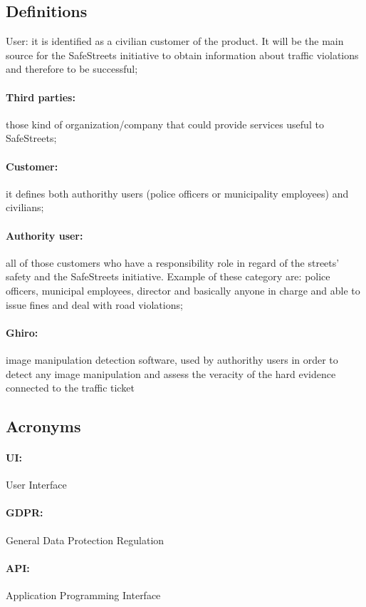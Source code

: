         \subsection{Definitions}
        {User:} it is identified as a civilian customer of the product. It will
        be the main source for the SafeStreets initiative to obtain information
        about traffic violations and therefore to be successful;
        \paragraph{Third parties:}those kind of organization/company that could
        provide services useful to SafeStreets; \paragraph{Customer:} it defines
        both authorithy users (police officers or municipality employees) and
        civilians; \paragraph{Authority user:}all of those customers who have a
        responsibility role in regard of the streets' safety and the SafeStreets
        initiative. Example of these category are: police officers, municipal
        employees, director and basically anyone in charge and able to issue
        fines and deal with road violations; \paragraph{Ghiro:} image
        manipulation detection software, used by authorithy users in order to
        detect any image manipulation and assess the veracity of the hard
        evidence connected to the traffic ticket\\
        \subsection{Acronyms}
        \paragraph{UI:} User Interface \paragraph{GDPR:} General Data Protection
        Regulation \paragraph{API:} Application Programming Interface
